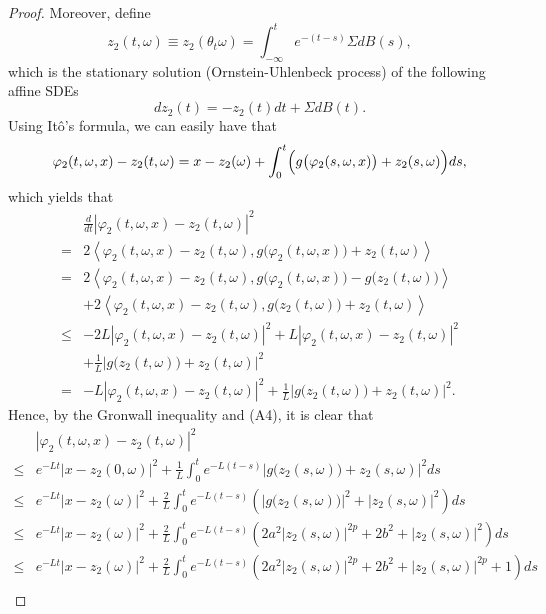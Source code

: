 \documentclass[10pt,a4paper]{amsart}
\begin{document}
\begin{proof}
Moreover, define
\begin{equation}\label{eq31}
z_2(t,\omega)\equiv z_2(\theta_t\omega)=\int_{-\infty}^te^{-(t-s)}\Sigma dB(s),
\end{equation}
which is the stationary solution (Ornstein-Uhlenbeck process) of the following affine SDEs
\begin{equation}\label{OU3}
dz_2(t)=-z_2(t)dt+\Sigma dB(t).
\end{equation}
Using It\^{o}'s formula, we can easily have that
\begin{equation}\label{eq32}
\varphi_2(t,\omega,x)-z_2(t,\omega)=x-z_2(\omega)+\int_0^t\Bigl(g\bigl(\varphi_2(s,\omega,x)\bigr)+z_2(s,\omega)\Bigr)ds,
\end{equation}
which yields that
\begin{align}\label{eq33}
&\frac{d}{dt}|\varphi_2(t,\omega,x)-z_2(t,\omega)|^2\nonumber\\
=&2\left\langle\varphi_2(t,\omega,x)-z_2(t,\omega),g\bigl(\varphi_2(t,\omega,x)\bigr)+z_2(t,\omega)\right\rangle\nonumber\\
=&2\left\langle\varphi_2(t,\omega,x)-z_2(t,\omega),g\bigl(\varphi_2(t,\omega,x)\bigr)-g\bigl(z_2(t,\omega)\bigr)\right\rangle\nonumber\\
&+2\left\langle\varphi_2(t,\omega,x)-z_2(t,\omega),g\bigl(z_2(t,\omega)\bigr)+z_2(t,\omega)\right\rangle\nonumber\\
\leq&-2L|\varphi_2(t,\omega,x)-z_2(t,\omega)|^2+L|\varphi_2(t,\omega,x)-z_2(t,\omega)|^2\nonumber\\
&+\frac1L|g\bigl(z_2(t,\omega)\bigr)+z_2(t,\omega)|^2\nonumber\\
=&-L|\varphi_2(t,\omega,x)-z_2(t,\omega)|^2+\frac1L|g\bigl(z_2(t,\omega)\bigr)+z_2(t,\omega)|^2.
\end{align}
Hence, by the Gronwall inequality and (A4), it is clear that
\begin{align}
&|\varphi_2(t,\omega,x)-z_2(t,\omega)|^2\nonumber\\
\leq& e^{-Lt}|x-z_2(0,\omega)|^2+\frac1L\int_0^te^{-L(t-s)}|g\bigl(z_2(s,\omega)\bigr)+z_2(s,\omega)|^2ds\nonumber\\
\leq& e^{-Lt}|x-z_2(\omega)|^2+\frac2L\int_0^te^{-L(t-s)}\left(|g\bigl(z_2(s,\omega)\bigr)|^2+|z_2(s,\omega)|^2\right)ds\nonumber\\
\leq& e^{-Lt}|x-z_2(\omega)|^2+\frac2L\int_0^te^{-L(t-s)}\left(2a^2|z_2(s,\omega)|^{2p}+2b^2+|z_2(s,\omega)|^2\right)ds\nonumber\\
\leq& e^{-Lt}|x-z_2(\omega)|^2+\frac2L\int_0^te^{-L(t-s)}\left(2a^2|z_2(s,\omega)|^{2p}+2b^2+|z_2(s,\omega)|^{2p}+1\right)ds\nonumber\\

\end{align}
\end{proof}
\end{document}
